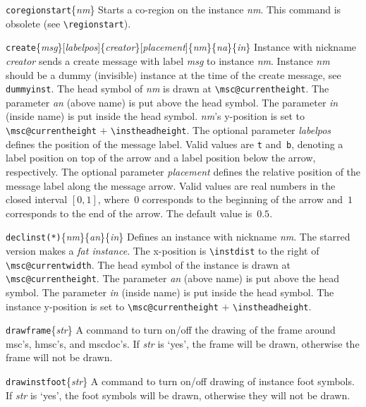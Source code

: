 \documentclass[a4paper]{article}
\newcommand{\cmd}[1]{\texttt{\bslash #1}}
\newcommand{\opt}[1]{[#1]}
\newenvironment{defs}{%
  \begin{list}{}%
              {\setlength{\labelwidth}{0pt}%
               \setlength{\labelsep}{1em}%
               \setlength{\leftmargin}{1em}%
               \setlength{\parsep}{1ex}%
               \setlength{\listparindent}{0pt}%
               \setlength{\rightmargin}{0pt}%
               \renewcommand{\makelabel}[1]{##1}%
               \raggedright%
              }%
  }{%
  \end{list}}
\begin{document}
\begin{defs}
\item[\cmd{coregionstart}\{\emph{nm}\}] Starts a co-region on the instance
\emph{nm}. This command is obsolete (see \verb|\regionstart|).

\item[\cmd{create}\{\emph{msg}\}\opt{\emph{labelpos}}\{\emph{creator}\}\opt{\emph{placement}}\{\emph{nm}\}\{\emph{na}\}\{\emph{in}\}]
Instance with nickname \emph{creator} sends a create message with
label \emph{msg} to instance \emph{nm}. Instance \emph{nm} should be a
dummy (invisible) instance at the time of the create message, see
\cmd{dummyinst}. The head symbol of \emph{nm} is drawn at
\verb|\msc@currentheight|. The parameter \emph{an} (above name) is put
above the head symbol. The parameter \emph{in} (inside name) is put
inside the head symbol. \emph{nm}'s y-position is set to
\verb|\msc@currentheight| $+$ \verb|\instheadheight|.  The optional
parameter \emph{labelpos} defines the position of the message label. Valid
values are \verb|t| and~\verb|b|, denoting a label position on top of
the arrow and a label position below the arrow, respectively.  The
optional parameter \emph{placement} defines the relative position of
the message label along the message arrow. Valid values are real
numbers in the closed interval $[0,1]$, where~$0$ corresponds to the
beginning of the arrow and~$1$ corresponds to the end of the
arrow. The default value is~$0.5$.

\item[\cmd{declinst(*)}\{\emph{nm}\}\{\emph{an}\}\{\emph{in}\}]
Defines an instance with nickname \emph{nm}.  The starred version
makes a \emph{fat instance}. The x-position is \verb|\instdist| to the
right of \verb|\msc@currentwidth|. The head symbol of the instance is
drawn at \verb|\msc@currentheight|. The parameter \emph{an} (above
name) is put above the head symbol. The parameter \emph{in} (inside
name) is put inside the head symbol. The
instance y-position is set to \verb|\msc@currentheight| $+$ \verb|\instheadheight|.


\item[\cmd{drawframe}\{\emph{str}\}] A command to turn on/off the
drawing of the frame around msc's, hmsc's, and mscdoc's. If \emph{str}
is `yes', the frame will be drawn, otherwise the frame will not be
drawn.

\item[\cmd{drawinstfoot}\{\emph{str}\}] A command to turn on/off
drawing of instance foot symbols. If \emph{str} is `yes', the foot
symbols will be drawn, otherwise they will not be drawn.


\end{defs}
\end{document}
